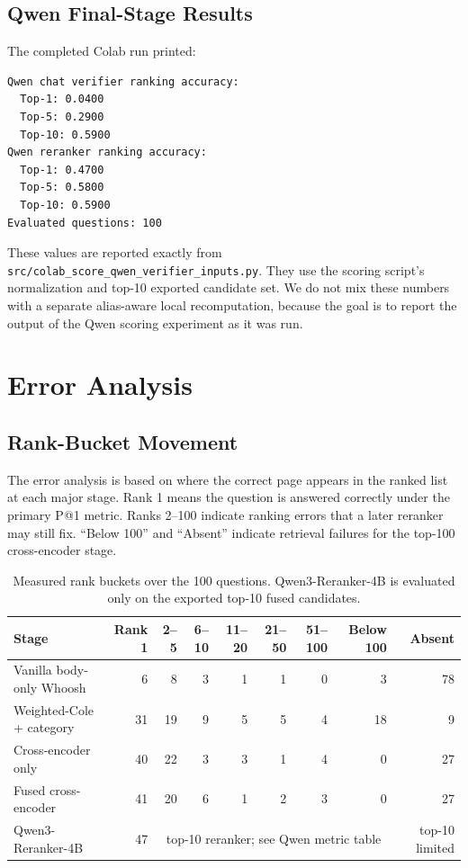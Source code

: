 \documentclass[11pt]{article}
\begin{document}
\subsection{Qwen Final-Stage Results}

The completed Colab run printed:

\begin{verbatim}
Qwen chat verifier ranking accuracy:
  Top-1: 0.0400
  Top-5: 0.2900
  Top-10: 0.5900
Qwen reranker ranking accuracy:
  Top-1: 0.4700
  Top-5: 0.5800
  Top-10: 0.5900
Evaluated questions: 100
\end{verbatim}

These values are reported exactly from \texttt{src/colab\_score\_qwen\_verifier\_inputs.py}. They use the scoring script's normalization and top-10 exported candidate set. We do not mix these numbers with a separate alias-aware local recomputation, because the goal is to report the output of the Qwen scoring experiment as it was run.

\section{Error Analysis}

\subsection{Rank-Bucket Movement}

The error analysis is based on where the correct page appears in the ranked list at each major stage. Rank 1 means the question is answered correctly under the primary P@1 metric. Ranks 2--100 indicate ranking errors that a later reranker may still fix. ``Below 100'' and ``Absent'' indicate retrieval failures for the top-100 cross-encoder stage.

\begin{table}[h]
\centering
\scriptsize
\begin{tabular}{lrrrrrrrr}
\toprule
Stage & Rank 1 & 2--5 & 6--10 & 11--20 & 21--50 & 51--100 & Below 100 & Absent \\
\midrule
Vanilla body-only Whoosh & 6 & 8 & 3 & 1 & 1 & 0 & 3 & 78 \\
Weighted-Cole + category & 31 & 19 & 9 & 5 & 5 & 4 & 18 & 9 \\
Cross-encoder only & 40 & 22 & 3 & 3 & 1 & 4 & 0 & 27 \\
Fused cross-encoder & 41 & 20 & 6 & 1 & 2 & 3 & 0 & 27 \\
Qwen3-Reranker-4B & 47 & \multicolumn{6}{c}{top-10 reranker; see Qwen metric table} & top-10 limited \\
\bottomrule
\end{tabular}
\caption{Measured rank buckets over the 100 questions. Qwen3-Reranker-4B is evaluated only on the exported top-10 fused candidates.}
\end{table}
\end{document}
